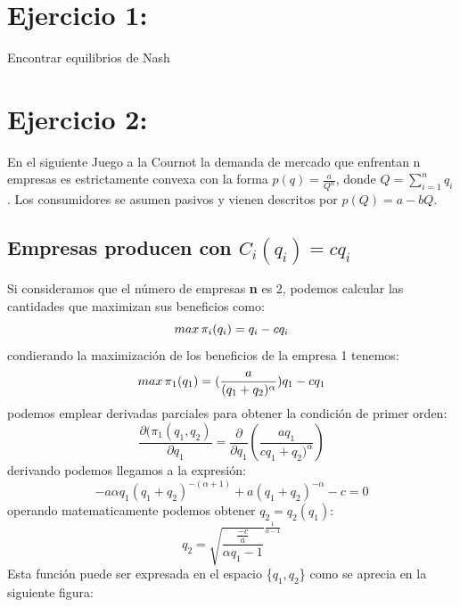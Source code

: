 \documentclass{article}
\begin{document}




\section{Ejercicio 1:}
Encontrar equilibrios de Nash

\section{Ejercicio 2:}

En el siguiente Juego a la Cournot la demanda de mercado que enfrentan n empresas es estrictamente convexa con la forma
$p(q)=\frac{a}{Q^\alpha}$, donde $Q=\sum_{i=1}^n q_i$. Los consumidores se asumen pasivos y vienen descritos por $p(Q)=a-bQ$.

\subsection{Empresas producen con $C_i(q_i)=cq_i$}
Si consideramos que el n\'umero de empresas \textbf{n} es 2, podemos calcular las cantidades que maximizan sus beneficios como:
 $$max\thinspace \pi_i(q_i)=q_i-cq_i$$
 condierando la maximizaci\'on de los beneficios de la empresa 1 tenemos:
 $$max\thinspace \pi_1(q_1)=(\frac{a}{(q_1+q_2)^\alpha})q_1-cq_1$$
podemos emplear derivadas parciales para obtener la condici\'on de primer orden:
  $$\frac{\partial(\pi_1(q_1,q_2)}{\partial q_1} = \frac{\partial}{\partial q_1} (\frac{aq_1}{cq_1+q_2)^\alpha})$$
  derivando podemos llegamos a la expresi\'on:
  $$-a\alpha q_1(q_1+q_2)^{-(\alpha+1)}+a(q_1+q_2)^{-\alpha}-c=0$$
  operando matematicamente podemos obtener $q_2=q_2(q_1)$:
$$q_2=\sqrt{\frac{\frac{-c}{a}}{\alpha q_1-1}}^{\frac{1}{\alpha-1}}$$
Esta funci\'on puede ser expresada en el espacio \{$q_1,q_2$\} como se aprecia en la siguiente figura:
\end{document}
